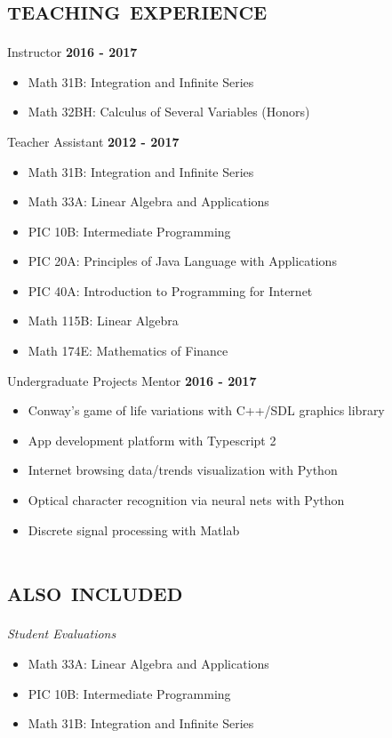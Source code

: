\documentclass[margin, 10pt]{res} %
\begin{document}
\begin{resume}
\section{\textsc{teaching experience}}
Instructor \hfill \textbf{2016 - 2017} 
  \begin{itemize}
  \item Math 31B: Integration and Infinite Series 
  \item Math 32BH: Calculus of Several Variables (Honors) 
  \end{itemize}
Teacher Assistant \hfill \textbf{2012 - 2017} 
  \begin{itemize}
  \item Math 31B: Integration and Infinite Series %
  \item Math 33A: Linear Algebra and Applications %
  \item PIC 10B: Intermediate Programming %
  \item PIC 20A: Principles of Java Language with Applications %
  \item PIC 40A: Introduction to Programming for Internet %
  \item Math 115B: Linear Algebra %
  \item Math 174E: Mathematics of Finance %
  \end{itemize}
Undergraduate Projects Mentor \hfill \textbf{2016 - 2017} 
  \begin{itemize}
  \item Conway's game of life variations with C++/SDL graphics library %
  \item App development platform with Typescript 2 %
  \item Internet browsing data/trends visualization with Python %
  \item Optical character recognition via neural nets with Python %
  \item Discrete signal processing with Matlab %
  \end{itemize}

\section{\textsc{also included}}
\textit{Student Evaluations}
  \begin{itemize}
  \item Math 33A: Linear Algebra and Applications %
  \item PIC 10B: Intermediate Programming %
  \item Math 31B: Integration and Infinite Series %
  \end{itemize}
\end{resume}
\end{document}
